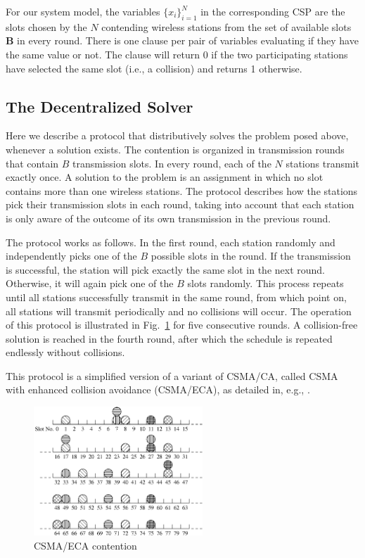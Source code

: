 \documentclass[journal]{IEEEtran}
\begin{document}
For our system model, the variables $\{x_i\}_{i=1}^{N}$ in the corresponding CSP are the slots chosen by the $N$ contending wireless stations from the set of available slots $\mathbf{B}$ in every round. There is one clause per pair of variables evaluating if they have the same value or not. The clause will return 0 if the two participating stations have selected the same slot (i.e., a collision) and returns 1 otherwise.

\subsection{The Decentralized Solver}

Here we describe a protocol that distributively solves the problem posed above, whenever a solution exists. The contention is organized in transmission rounds that contain $B$ transmission slots. In every round, each of the $N$ stations transmit exactly once. A solution to the problem is an assignment in which no slot contains more than one wireless stations. The protocol describes how the stations pick their transmission slots in each round, taking into account that each station is only aware of the outcome of its own transmission in the previous round.

The protocol works as follows. In the first round, each station randomly and independently picks one of the $B$ possible slots in the round. If the transmission is successful, the station will pick exactly the same slot in the next round. Otherwise, it will again pick one of the $B$ slots randomly. This process repeats until all stations successfully transmit in the same round, from which point on, all stations will transmit periodically and no collisions will occur. The operation of this protocol is illustrated in Fig.~\ref{fig:csma_eca_compact} for five consecutive rounds. A collision-free solution is reached in the fourth round, after which the schedule is repeated endlessly without collisions. 

This protocol is a simplified version of a variant of CSMA/CA, called CSMA with enhanced collision avoidance (CSMA/ECA), as detailed in, e.g., \cite{barcelo2008lba,he2009srb,barcelo2009tpc,fang2011dlm}.

\begin{figure}
  \centering
  \includegraphics[width=2.5in]{figures/csma_eca_compact}
  \caption{CSMA/ECA contention}
  \label{fig:csma_eca_compact}
\end{figure}
\end{document}
